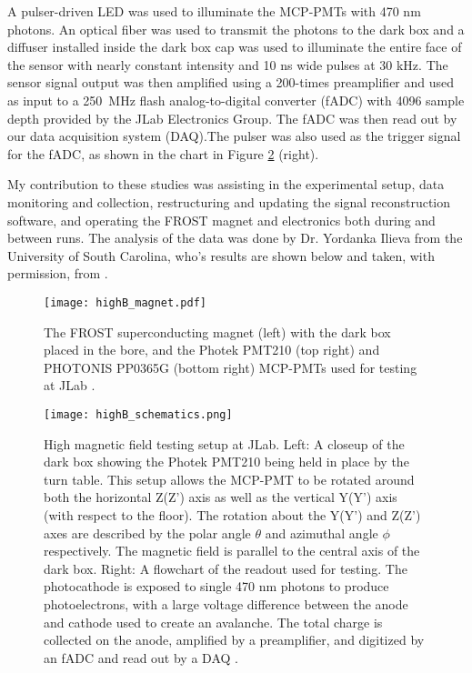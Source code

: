 A pulser-driven LED was used to illuminate the MCP-PMTs with 470 nm photons. An optical fiber was used to transmit the photons to the dark box and a diffuser installed inside the dark box cap was used to illuminate the entire face of the sensor with nearly constant intensity and 10 ns wide pulses at 30 kHz. The sensor signal output was then amplified using a 200-times preamplifier and used as input to a 250~MHz flash analog-to-digital converter (fADC) with 4096 sample depth provided by the JLab Electronics Group. The fADC was then read out by our data acquisition system (DAQ).The pulser was also used as the trigger signal for the fADC, as shown in the chart in Figure \ref{fig:highB_schematics} (right).

My contribution to these studies was assisting in the experimental setup, data monitoring and collection, restructuring and updating the signal reconstruction software, and operating the FROST magnet and electronics both during and between runs. The analysis of the data was done by Dr. Yordanka Ilieva from the University of South Carolina, who's results are shown below and taken, with permission, from \cite{HighB_DIRC2015}.


\begin{figure}[!htb]
	\centering
	\texttt{[image: highB\_magnet.pdf]}
	\caption[The FROST superconducting magnet (left) with the dark box placed in the bore, and the Photek PMT210 (top right) and PHOTONIS PP0365G (bottom right) MCP-PMTs used for testing at JLab.]{The FROST superconducting magnet (left) with the dark box placed in the bore, and the Photek PMT210 (top right) and PHOTONIS PP0365G (bottom right) MCP-PMTs used for testing at JLab \cite{HighB_DIRC2015}.}
	\label{fig:highB_magnet}
\end{figure}

\begin{figure}[!htb]
	\centering
	\texttt{[image: highB\_schematics.png]}
	\caption[High magnetic field testing setup at JLab.]{High magnetic field testing setup at JLab. Left: A closeup of the dark box showing the Photek PMT210 being held in place by the turn table. This setup allows the MCP-PMT to be rotated around both the horizontal Z(Z') axis as well as the vertical Y(Y') axis (with respect to the floor). The rotation about the Y(Y') and Z(Z') axes are described by the polar angle $\theta$ and azimuthal angle $\phi$ respectively. The magnetic field is parallel to the central axis of the dark box. Right: A flowchart of the readout used for testing. The photocathode is exposed to single 470 nm photons to produce photoelectrons, with a large voltage difference between the anode and cathode used to create an avalanche. The total charge is collected on the anode, amplified by a preamplifier, and digitized by an fADC and read out by a DAQ \cite{HighB_DIRC2015}.}
	\label{fig:highB_schematics}
\end{figure}

